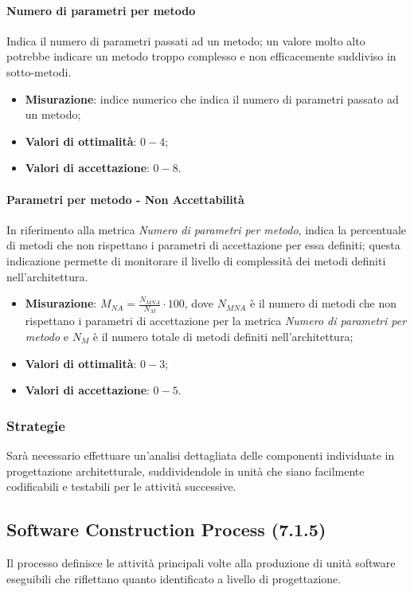\paragraph{Numero di parametri per metodo}
Indica il numero di parametri passati ad un metodo; un valore molto alto potrebbe indicare un metodo troppo complesso e non efficacemente suddiviso in sotto-metodi.
\begin{itemize}
\item \textbf{Misurazione}: indice numerico che indica il numero di parametri passato ad un metodo;
\item \textbf{Valori di ottimalità}: $0 - 4$;
\item \textbf{Valori di accettazione}: $0 - 8$.
\end{itemize}
\paragraph{Parametri per metodo - Non Accettabilità}
\label{numParMetodoNA}
In riferimento alla metrica \textit{Numero di parametri per metodo}, indica la percentuale di metodi che non rispettano i parametri di accettazione per essa definiti; questa indicazione permette di monitorare il livello di complessità dei metodi definiti nell'architettura.
\begin{itemize}
\item \textbf{Misurazione}: $M_{NA}=\frac{N_{MNA}}{N_{M}} \cdot 100$, dove $N_{MNA}$ è il numero di metodi che non rispettano i parametri di accettazione per la metrica \textit{Numero di parametri per metodo} e $N_{M}$ è il numero totale di metodi definiti nell'architettura;
\item \textbf{Valori di ottimalità}: $0 - 3$;
\item \textbf{Valori di accettazione}: $0 - 5$.
\end{itemize}
\subsubsection{Strategie}
Sarà necessario effettuare un'analisi dettagliata delle componenti individuate in progettazione architetturale, suddividendole in unità che siano facilmente codificabili e testabili per le attività successive.
\subsection{Software Construction Process (7.1.5)}
\label{soConstruction}
Il processo definisce le attività principali volte alla produzione di unità software eseguibili che riflettano quanto identificato a livello di progettazione.
